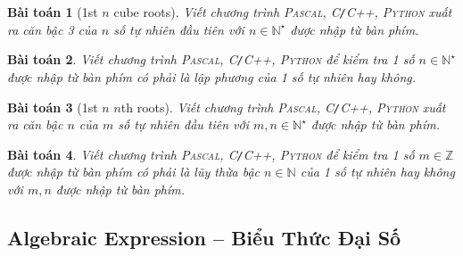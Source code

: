 \documentclass{article}
\newtheorem{baitoan}{Bài toán}
\begin{document}
\begin{baitoan}[1st $n$ cube roots]
	Viết chương trình \textsc{Pascal, C\texttt{/}C++, Python} xuất ra căn bậc 3 của $n$ số tự nhiên đầu tiên với $n\in\mathbb{N}^\star$ được nhập từ bàn phím.
\end{baitoan}

\begin{baitoan}
	Viết chương trình \textsc{Pascal, C\texttt{/}C++, Python} để kiểm tra 1 số $n\in\mathbb{N}^\star$ được nhập từ bàn phím có phải là lập phương của 1 số tự nhiên hay không.
\end{baitoan}

\begin{baitoan}[1st $n$ $n$th roots]
	Viết chương trình \textsc{Pascal, C\texttt{/}C++, Python} xuất ra căn bậc $n$ của $m$ số tự nhiên đầu tiên với $m,n\in\mathbb{N}^\star$ được nhập từ bàn phím.
\end{baitoan}

\begin{baitoan}
	Viết chương trình \textsc{Pascal, C\texttt{/}C++, Python} để kiểm tra 1 số $m\in\mathbb{Z}$ được nhập từ bàn phím có phải là lũy thừa bậc $n\in\mathbb{N}$ của 1 số tự nhiên hay không với $m,n$ được nhập từ bàn phím.
\end{baitoan}


\subsection{Algebraic Expression -- Biểu Thức Đại Số}
\end{document}
